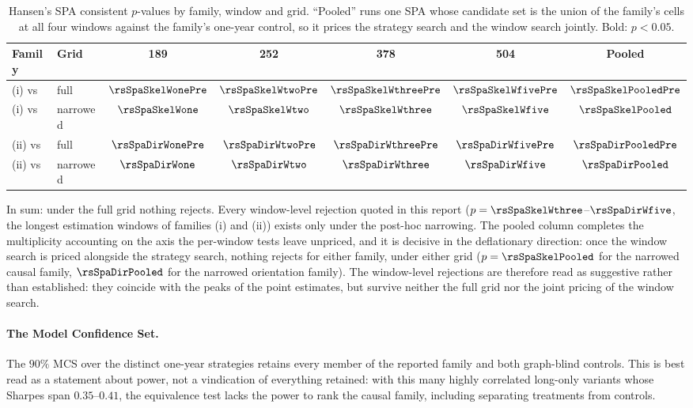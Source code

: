 \begin{table}[t]
  \centering
  \caption{Hansen's SPA consistent $p$-values by family, window and
    grid. ``Pooled'' runs one SPA whose candidate set is the union of
    the family's cells at all four windows against the family's one-year
    control, so it prices the strategy search and the window search
    jointly. Bold: $p<0.05$.}
  \label{tab:spa}
  \small
  \begin{tabular}{l l c c c c c}
    \toprule
    Family & Grid & 189 & 252 & 378 & 504 & Pooled \\
    \midrule
    (i) vs \HRP{}      & full     & $\rsSpaSkelWonePre$ & $\rsSpaSkelWtwoPre$ & $\rsSpaSkelWthreePre$ & $\rsSpaSkelWfivePre$ & $\rsSpaSkelPooledPre$ \\
    (i) vs \HRP{}      & narrowed & $\rsSpaSkelWone$ & $\rsSpaSkelWtwo$ & $\mathbf{\rsSpaSkelWthree}$ & $\mathbf{\rsSpaSkelWfive}$ & $\rsSpaSkelPooled$ \\
    (ii) vs \skelsamp{} & full     & $\rsSpaDirWonePre$ & $\rsSpaDirWtwoPre$ & $\rsSpaDirWthreePre$ & $\rsSpaDirWfivePre$ & $\rsSpaDirPooledPre$ \\
    (ii) vs \skelsamp{} & narrowed & $\rsSpaDirWone$ & $\rsSpaDirWtwo$ & $\rsSpaDirWthree$ & $\mathbf{\rsSpaDirWfive}$ & $\rsSpaDirPooled$ \\
    \bottomrule
  \end{tabular}
\end{table}

In sum: under the full grid nothing rejects. Every
window-level rejection quoted in this report
($p=\rsSpaSkelWthree$--$\rsSpaDirWfive$, the longest estimation windows of
families (i) and (ii)) exists only under the post-hoc narrowing.
The pooled column completes the multiplicity accounting on the axis the
per-window tests leave unpriced, and it is decisive in the deflationary
direction: once the window search is priced alongside the strategy
search, nothing rejects for either family, under either grid
($p=\rsSpaSkelPooled$ for the narrowed causal family,
$\rsSpaDirPooled$ for the narrowed orientation family). The
window-level rejections are therefore read as
suggestive rather than established: they coincide with the peaks of
the point estimates, but survive neither the full grid nor the joint
pricing of the window search.

\paragraph{The Model Confidence Set.} The $90\%$ MCS over the
distinct one-year strategies retains every member of the reported
family and both graph-blind controls. This is best read as a statement
about
power, not a vindication of everything retained: with this many highly
correlated long-only variants whose Sharpes span $0.35$--$0.41$, the
equivalence test lacks the power to rank the causal family, including
separating treatments from controls.

